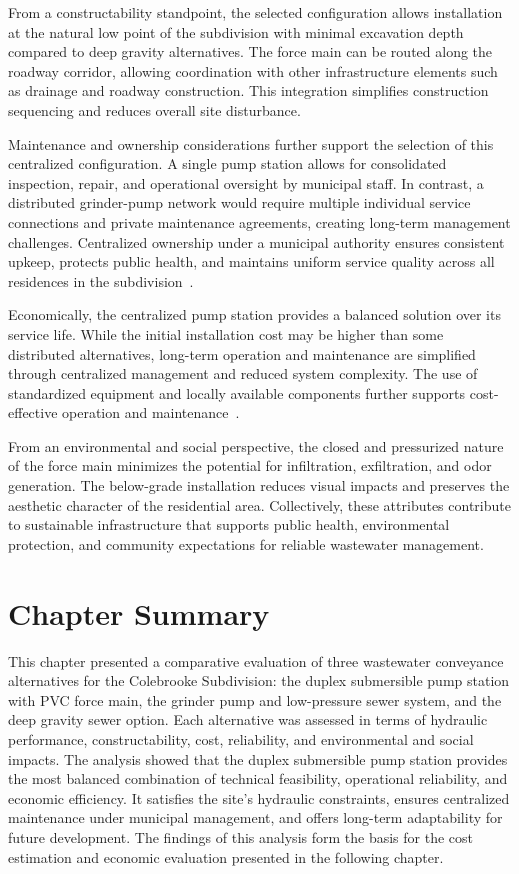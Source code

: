 From a constructability standpoint, the selected configuration allows installation at the natural low point of the subdivision with minimal excavation depth compared to deep gravity alternatives. The force main can be routed along the roadway corridor, allowing coordination with other infrastructure elements such as drainage and roadway construction. This integration simplifies construction sequencing and reduces overall site disturbance.

Maintenance and ownership considerations further support the selection of this centralized configuration. A single pump station allows for consolidated inspection, repair, and operational oversight by municipal staff. In contrast, a distributed grinder-pump network would require multiple individual service connections and private maintenance agreements, creating long-term management challenges. Centralized ownership under a municipal authority ensures consistent upkeep, protects public health, and maintains uniform service quality across all residences in the subdivision~\cite{EPA_LiftStation_DesignManual_2004}.

Economically, the centralized pump station provides a balanced solution over its service life. While the initial installation cost may be higher than some distributed alternatives, long-term operation and maintenance are simplified through centralized management and reduced system complexity. The use of standardized equipment and locally available components further supports cost-effective operation and maintenance~\cite{RSMeans_CostData_2025,ExcelFluidGroup_PumpComparison_2024}.

From an environmental and social perspective, the closed and pressurized nature of the force main minimizes the potential for infiltration, exfiltration, and odor generation. The below-grade installation reduces visual impacts and preserves the aesthetic character of the residential area. Collectively, these attributes contribute to sustainable infrastructure that supports public health, environmental protection, and community expectations for reliable wastewater management.

\section{Chapter Summary}\label{sec:chapter4_summary}

This chapter presented a comparative evaluation of three wastewater conveyance alternatives for the Colebrooke Subdivision: the duplex submersible pump station with PVC force main, the grinder pump and low-pressure sewer system, and the deep gravity sewer option. Each alternative was assessed in terms of hydraulic performance, constructability, cost, reliability, and environmental and social impacts. The analysis showed that the duplex submersible pump station provides the most balanced combination of technical feasibility, operational reliability, and economic efficiency. It satisfies the site’s hydraulic constraints, ensures centralized maintenance under municipal management, and offers long-term adaptability for future development. The findings of this analysis form the basis for the cost estimation and economic evaluation presented in the following chapter.

